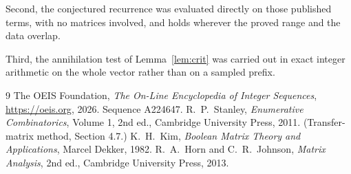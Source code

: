 \documentclass[11pt,a4paper]{article}
\theoremstyle{plain}
\theoremstyle{definition}
\begin{document}
Second, the conjectured recurrence was evaluated directly on those published terms, with no
matrices involved, and holds wherever the proved range and the data overlap.

Third, the annihilation test of Lemma~\ref{lem:crit} was carried out in exact integer
arithmetic on the whole vector rather than on a sampled prefix.

\begin{thebibliography}{9}
 The OEIS Foundation, \emph{The On-Line Encyclopedia of Integer
Sequences}, \url{https://oeis.org}, 2026. Sequence A224647.
 R.~P.~Stanley, \emph{Enumerative Combinatorics}, Volume 1, 2nd ed.,
Cambridge University Press, 2011. (Transfer-matrix method, Section 4.7.)
 K.~H.~Kim, \emph{Boolean Matrix Theory and Applications}, Marcel Dekker,
1982.
 R.~A.~Horn and C.~R.~Johnson, \emph{Matrix Analysis}, 2nd ed., Cambridge
University Press, 2013.
\end{thebibliography}
\end{document}
